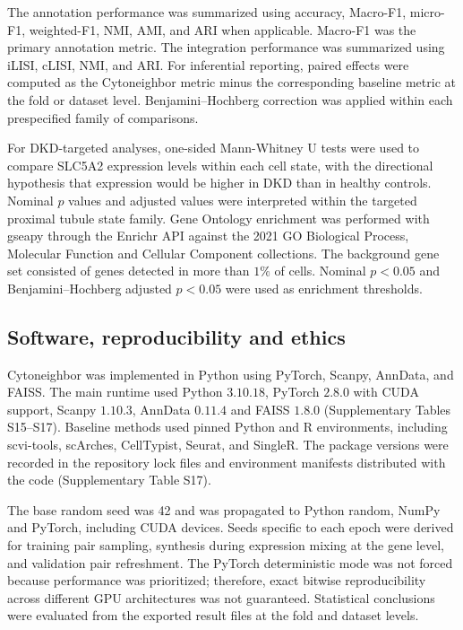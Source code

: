 \documentclass[11pt]{article}
\begin{document}
The annotation performance was summarized using accuracy, Macro-F1, micro-F1, weighted-F1, NMI, AMI, and ARI when applicable. Macro-F1 was the primary annotation metric. The integration performance was summarized using iLISI, cLISI, NMI, and ARI. For inferential reporting, paired effects were computed as the Cytoneighbor metric minus the corresponding baseline metric at the fold or dataset level. Benjamini--Hochberg correction was applied within each prespecified family of comparisons.

For DKD-targeted analyses, one-sided Mann-Whitney U tests were used to compare SLC5A2 expression levels within each cell state, with the directional hypothesis that expression would be higher in DKD than in healthy controls. Nominal $p$ values and adjusted values were interpreted within the targeted proximal tubule state family. Gene Ontology enrichment was performed with gseapy through the Enrichr API against the 2021 GO Biological Process, Molecular Function and Cellular Component collections. The background gene set consisted of genes detected in more than $1\%$ of cells. Nominal $p<0.05$ and Benjamini--Hochberg adjusted $p<0.05$ were used as enrichment thresholds.

\subsection*{Software, reproducibility and ethics}

Cytoneighbor was implemented in Python using PyTorch, Scanpy, AnnData, and FAISS. The main runtime used Python $3.10.18$, PyTorch $2.8.0$ with CUDA support, Scanpy $1.10.3$, AnnData $0.11.4$ and FAISS $1.8.0$ (Supplementary Tables S15--S17). Baseline methods used pinned Python and R environments, including scvi-tools, scArches, CellTypist, Seurat, and SingleR. The package versions were recorded in the repository lock files and environment manifests distributed with the code (Supplementary Table S17).

The base random seed was 42 and was propagated to Python random, NumPy and PyTorch, including CUDA devices. Seeds specific to each epoch were derived for training pair sampling, synthesis during expression mixing at the gene level, and validation pair refreshment. The PyTorch deterministic mode was not forced because performance was prioritized; therefore, exact bitwise reproducibility across different GPU architectures was not guaranteed. Statistical conclusions were evaluated from the exported result files at the fold and dataset levels.
\end{document}
